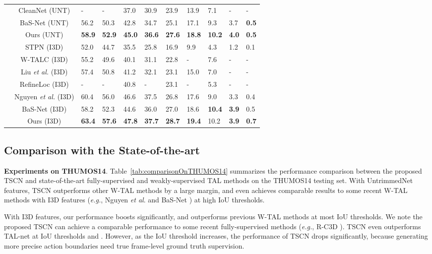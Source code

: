 \documentclass[runningheads]{llncs}
\begin{document}
\begin{table}[t]
\begin{tabular}{c|c|C{0.7cm}C{0.7cm}C{0.7cm}C{0.7cm}C{0.7cm}C{0.7cm}C{0.7cm}C{0.7cm}C{0.7cm}}
	& CleanNet (UNT) \cite{liu2019weakly} & - & - & 37.0 & 30.9 & 23.9 & 13.9 & 7.1 & - & - \\
	& BaS-Net (UNT) \cite{lee2020background} & 56.2 & 50.3 & 42.8 & 34.7 & 25.1 & 17.1 & 9.3 & 3.7 & \textbf{0.5} \\ 
	& Ours (UNT) & \textbf{58.9} & \textbf{52.9} & \textbf{45.0} & \textbf{36.6} & \textbf{27.6} & \textbf{18.8} & \textbf{10.2} & \textbf{4.0} & \textbf{0.5} \\
	& STPN (I3D) \cite{nguyen2018weakly} & 52.0 & 44.7 & 35.5 & 25.8 & 16.9 & 9.9 & 4.3 & 1.2 & 0.1 \\
	& W-TALC (I3D) \cite{paul2018w} & 55.2 & 49.6 & 40.1 & 31.1 & 22.8 & - & 7.6 & - & - \\
	& Liu \textit{et al.} (I3D) \cite{liu2019completeness} & 57.4 & 50.8 & 41.2 & 32.1 & 23.1 & 15.0 & 7.0 & - & - \\
	& RefineLoc (I3D) \cite{alwassel2019refineloc} & - & - & 40.8 & - & 23.1 & - & 5.3 & - & - \\
	& Nguyen \textit{et al.} (I3D) \cite{nguyen2019weakly} & 60.4 & 56.0 & 46.6 & 37.5 & 26.8 & 17.6 & 9.0 & 3.3 & 0.4 \\ 
	& BaS-Net (I3D) \cite{lee2020background} & 58.2 & 52.3 & 44.6 & 36.0 & 27.0 & 18.6 & \textbf{10.4} & \textbf{3.9} & 0.5 \\
	& Ours (I3D) & \textbf{63.4} & \textbf{57.6} & \textbf{47.8} & \textbf{37.7} & \textbf{28.7} & \textbf{19.4} & 10.2 & \textbf{3.9} & \textbf{0.7} \\
	\hline
	\end{tabular} 
\end{table}


\subsection{Comparison with the State-of-the-art}
\textbf{Experiments on THUMOS14}. Table~\ref{tab:comparisonOnTHUMOS14} summarizes the performance comparison between the proposed TSCN and state-of-the-art fully-supervised and weakly-supervised TAL methods on the THUMOS14 testing set. With UntrimmedNet features, TSCN outperforms other W-TAL methods by a large margin, and even achieves comparable results to some recent W-TAL methods with I3D features (\textit{e.g.}, Nguyen \textit{et al}. \cite{nguyen2019weakly} and BaS-Net \cite{lee2020background}) at high IoU thresholds. 

With I3D features, our performance boosts significantly, and outperforms previous W-TAL methods at most IoU thresholds. We note the proposed TSCN can achieve a comparable performance to some recent fully-supervised methods (\textit{e.g.}, R-C3D \cite{xu2017r}). TSCN even outperforms TAL-net \cite{chao2018rethinking} at IoU thresholds  and . However, as the IoU threshold increases, the performance of TSCN drops significantly, because generating more precise action boundaries need true frame-level ground truth supervision.
\end{document}
